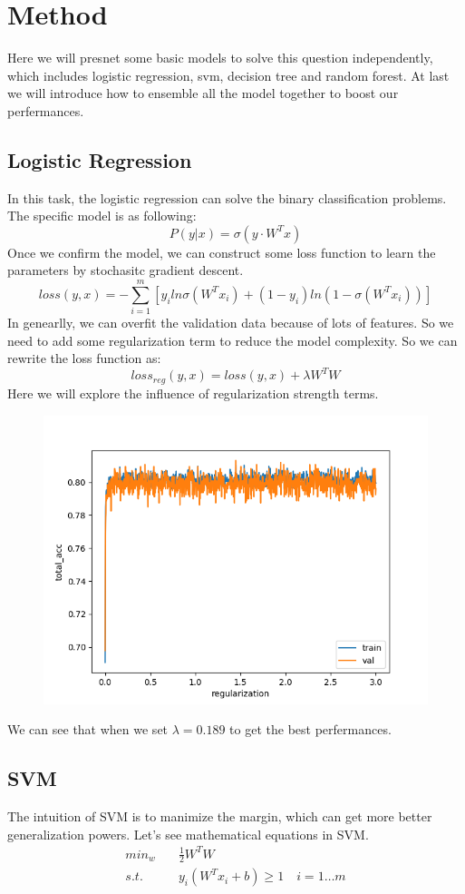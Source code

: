 
\section{Method}
Here we will presnet some basic models to solve this question independently, which includes logistic regression, svm, decision tree and random forest. At last we will introduce how to ensemble all the model together to boost our perfermances.
\subsection{Logistic Regression}
In this task, the logistic regression can solve the binary classification problems. The specific model is as following:
\begin{equation}
    P(y|x) = \sigma(y\cdot W^Tx)
\end{equation}
Once we confirm the model, we can construct some loss function to learn the parameters by stochasitc gradient descent.
\begin{equation}
    loss(y, x) = -\sum_{i=1}^{m} [y_i ln\sigma(W^Tx_i)+(1-y_i)ln(1-\sigma(W^Tx_i))]
\end{equation}
In genearlly, we can overfit the validation data because of lots of features. So we need to add some regularization term to reduce the model complexity.
So we can rewrite the loss function as:
\begin{equation}
    loss_{reg}(y,x) = loss(y, x) + \lambda W^TW
\end{equation}
Here we will explore the influence of regularization strength terms. 
\begin{figure}
    \centering
    \includegraphics[width=0.5\linewidth]{img/acc_bs1_total_smote.png}
    
\end{figure}
We can see that when we set $\lambda=0.189$ to get the best perfermances.

\subsection{SVM}
The intuition of SVM\cite{SVM} is to manimize the margin, which can get more better generalization powers. Let's see mathematical equations in SVM.
\begin{align}
    min_w & \quad \frac{1}{2} W^TW \\
    s.t. &\quad y_i(W^T x_i+b) \geq 1  \quad i = 1\dots m
\end{align}

